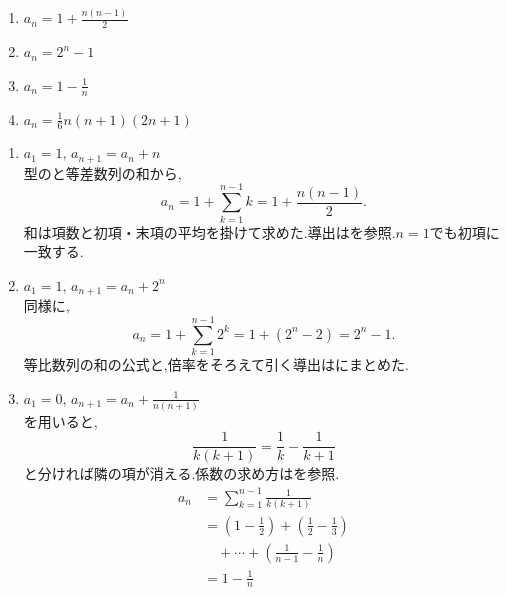     \noindent{}\par\nobreak
    \begin{enumerate}[label=(\arabic*),parsep=3pt,format=\bookitemlink{example-difference-1}{answer}{problem}]
      \item $\displaystyle a_n=1+\frac{n(n-1)}{2}$
      \item $\displaystyle a_n=2^n-1$
      \item $\displaystyle a_n=1-\frac{1}{n}$
      \item $\displaystyle a_n=\frac{1}{6}n(n+1)(2n+1)$
    \end{enumerate}

    \noindent{}\par\nobreak
    \begin{enumerate}[label=(\arabic*),parsep=3pt,format=\bookitemlink{example-difference-1}{solution}{problem}]
      \item $\displaystyle a_1=1,\,a_{n+1}=a_n+n$\\
            型のと等差数列の和から,
            \[
              a_n=1+\sum_{k=1}^{n-1}k=1+\frac{n(n-1)}2.
            \]
            和は項数と初項・末項の平均を掛けて求めた.導出はを参照.$n=1$でも初項に一致する.

      \item $\displaystyle a_1=1,\,a_{n+1}=a_n+2^n$\\
            同様に,
            \[
              a_n=1+\sum_{k=1}^{n-1}2^k=1+(2^n-2)=2^n-1.
            \]
            等比数列の和の公式と,倍率をそろえて引く導出はにまとめた.

      \item $\displaystyle a_1=0,\,a_{n+1}=a_n+\frac{1}{n(n+1)}$\\
            を用いると,
            \[
              \frac{1}{k(k+1)}
              =\frac{1}{k}-\frac{1}{k+1}
            \]
            と分ければ隣の項が消える.係数の求め方はを参照.
            \begin{align*}
              a_n
                &=\sum_{k=1}^{n-1}\frac{1}{k(k+1)}\\
                &=\left(1-\frac12\right)+\left(\frac12-\frac13\right)\\
                &\quad+\cdots+\left(\frac1{n-1}-\frac1n\right)\\
                &=1-\frac1n
            \end{align*}


\end{enumerate}
